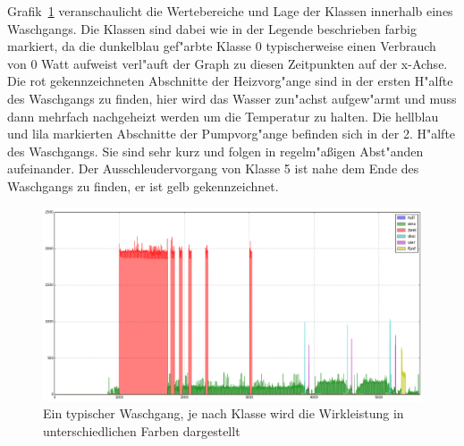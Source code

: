 Grafik~\ref{typWasch} veranschaulicht die Wertebereiche und Lage der Klassen innerhalb eines Waschgangs. Die Klassen sind dabei wie in der Legende beschrieben farbig markiert, da die dunkelblau  gef"arbte Klasse 0 typischerweise einen Verbrauch von 0 Watt aufweist verl"auft der Graph zu diesen Zeitpunkten auf der x-Achse. Die rot gekennzeichneten Abschnitte der Heizvorg"ange sind in der ersten H"alfte des Waschgangs zu finden, hier wird das Wasser zun"achst aufgew"armt und muss dann mehrfach nachgeheizt werden um die Temperatur zu halten. Die hellblau und lila markierten Abschnitte der Pumpvorg"ange befinden sich in der 2. H"alfte des Waschgangs. Sie sind sehr kurz und folgen in regelm"a{\ss}igen Abst"anden aufeinander. Der Ausschleudervorgang von Klasse 5 ist nahe dem Ende des Waschgangs zu finden, er ist gelb gekennzeichnet.
\begin{figure}[ht]
\includegraphics[width=\textheight , angle=90]{1_Grafiken/classes0.png}
	\caption[Typischer Waschgang, farbig annotiert]{Ein typischer Waschgang, je nach Klasse wird die Wirkleistung in unterschiedlichen Farben dargestellt}
\label{typWasch}
\end{figure}
